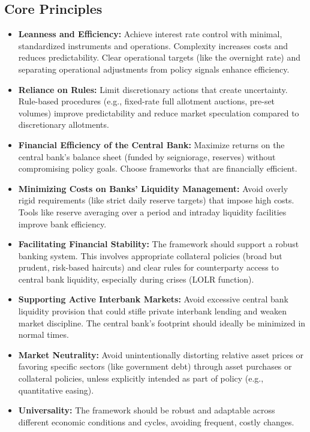 \subsection{Core Principles}
\begin{itemize}
    \item \textbf{Leanness and Efficiency:} Achieve interest rate control with minimal, standardized instruments and operations. Complexity increases costs and reduces predictability. Clear operational targets (like the overnight rate) and separating operational adjustments from policy signals enhance efficiency.
    \item \textbf{Reliance on Rules:} Limit discretionary actions that create uncertainty. Rule-based procedures (e.g., fixed-rate full allotment auctions, pre-set volumes) improve predictability and reduce market speculation compared to discretionary allotments.
    \item \textbf{Financial Efficiency of the Central Bank:} Maximize returns on the central bank's balance sheet (funded by seigniorage, reserves) without compromising policy goals. Choose frameworks that are financially efficient.
    \item \textbf{Minimizing Costs on Banks' Liquidity Management:} Avoid overly rigid requirements (like strict daily reserve targets) that impose high costs. Tools like reserve averaging over a period and intraday liquidity facilities improve bank efficiency.
    \item \textbf{Facilitating Financial Stability:} The framework should support a robust banking system. This involves appropriate collateral policies (broad but prudent, risk-based haircuts) and clear rules for counterparty access to central bank liquidity, especially during crises (LOLR function).
    \item \textbf{Supporting Active Interbank Markets:} Avoid excessive central bank liquidity provision that could stifle private interbank lending and weaken market discipline. The central bank's footprint should ideally be minimized in normal times.
    \item \textbf{Market Neutrality:} Avoid unintentionally distorting relative asset prices or favoring specific sectors (like government debt) through asset purchases or collateral policies, unless explicitly intended as part of policy (e.g., quantitative easing).
    \item \textbf{Universality:} The framework should be robust and adaptable across different economic conditions and cycles, avoiding frequent, costly changes.
\end{itemize}

